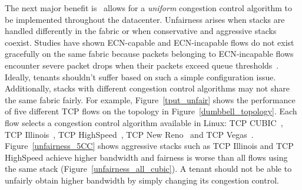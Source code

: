 The next major benefit is~\acdc{} allows for a {\em uniform}
congestion control algorithm to be implemented throughout the datacenter.
Unfairness arises when stacks are handled differently in the fabric or when conservative and aggressive
stacks coexist. Studies have shown ECN-capable and ECN-incapable flows do not exist gracefully on the
same fabric because packets belonging to ECN-incapable flows encounter severe packet drops when their packets
exceed queue thresholds~\cite{wu2012tuning,judd2015nsdi}. Ideally, tenants shouldn't suffer based on such a simple configuration issue.
Additionally, stacks with different congestion control algorithms may not share the same fabric fairly.
For example, Figure~\ref{tput_unfair} shows the performance of five different TCP flows on the topology in
Figure~\ref{dumbbell_topology}. Each flow selects a congestion control algorithm available in Linux:
TCP CUBIC~\cite{ha2008cubic}, TCP Illinois~\cite{liu2008tcp}, TCP HighSpeed~\cite{RFC3649},
TCP New Reno~\cite{RFC3782} and TCP Vegas~\cite{Brakmo1994}.
Figure~\ref{unfairness_5CC} shows aggressive stacks such as TCP Illinois and TCP HighSpeed
achieve higher bandwidth and fairness is worse than all flows using the
same stack (Figure~\ref{unfairness_all_cubic}). A tenant should not be able
to unfairly obtain higher bandwidth by simply changing its congestion control.


